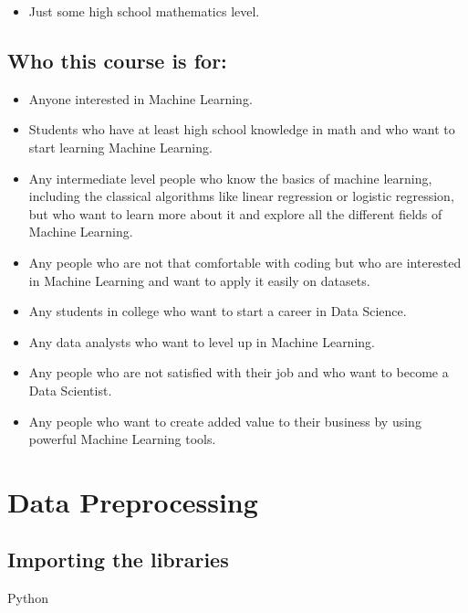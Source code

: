 \documentclass[
]{book}
\providecommand{\tightlist}{%
  \setlength{\itemsep}{0pt}\setlength{\parskip}{0pt}}
\theoremstyle{definition}
\theoremstyle{definition}
\theoremstyle{definition}
\theoremstyle{definition}
\theoremstyle{remark}
\begin{document}
\begin{itemize}
\tightlist
\item
  Just some high school mathematics level.
\end{itemize}

\hypertarget{who-this-course-is-for}{%
\section*{Who this course is for:}\label{who-this-course-is-for}}

\begin{itemize}
\item
  Anyone interested in Machine Learning.
\item
  Students who have at least high school knowledge in math and who want to start learning Machine Learning.
\item
  Any intermediate level people who know the basics of machine learning, including the classical algorithms like linear regression or logistic regression, but who want to learn more about it and explore all the different fields of Machine Learning.
\item
  Any people who are not that comfortable with coding but who are interested in Machine Learning and want to apply it easily on datasets.
\item
  Any students in college who want to start a career in Data Science.
\item
  Any data analysts who want to level up in Machine Learning.
\item
  Any people who are not satisfied with their job and who want to become a Data Scientist.
\item
  Any people who want to create added value to their business by using powerful Machine Learning tools.
\end{itemize}

\hypertarget{data-preprocessing}{%
\chapter{Data Preprocessing}\label{data-preprocessing}}

\hypertarget{importing-the-libraries}{%
\section{Importing the libraries}\label{importing-the-libraries}}

Python
\end{document}
